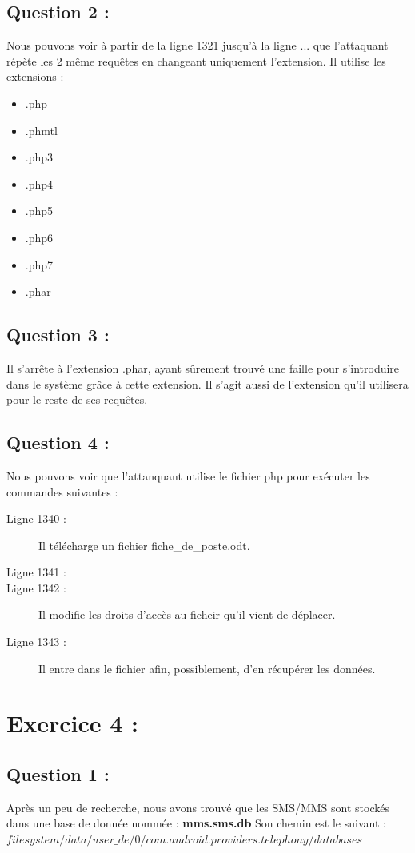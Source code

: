 \documentclass{article}
\begin{document}
    \subsection{Question 2 :}
        Nous pouvons voir à partir de la ligne 1321 jusqu'à la ligne ... que l'attaquant répète les 2 même requêtes en changeant uniquement l'extension.
        Il utilise les extensions :
        \begin{itemize}
            \item .php
            \item .phmtl
            \item .php3
            \item .php4
            \item .php5
            \item .php6
            \item .php7
            \item .phar
        \end{itemize}
    \subsection{Question 3 :}
        Il s'arrête à l'extension .phar, ayant sûrement trouvé une faille pour s'introduire dans le système grâce à cette extension.
        Il s'agit aussi de l'extension qu'il utilisera pour le reste de ses requêtes.
    \subsection{Question 4 :}
        Nous pouvons voir que l'attanquant utilise le fichier php pour exécuter les commandes suivantes :
        \begin{description}
            \item[Ligne 1340 :] Il télécharge un fichier fiche\_de\_poste.odt.
            \item[Ligne 1341 :] 
            \item[Ligne 1342 :] Il modifie les droits d'accès au ficheir qu'il vient de déplacer.
            \item[Ligne 1343 :] Il entre dans le fichier afin, possiblement, d'en récupérer les données.
        \end{description}
\section{Exercice 4 :}
    \subsection{Question 1 :}
        Après un peu de recherche, nous avons trouvé que les SMS/MMS sont stockés dans une base de donnée nommée : \textbf{mms.sms.db}\newline
        Son chemin est le suivant : $filesystem/data/user\_de/0/com.android.providers.telephony/databases$
\end{document}

